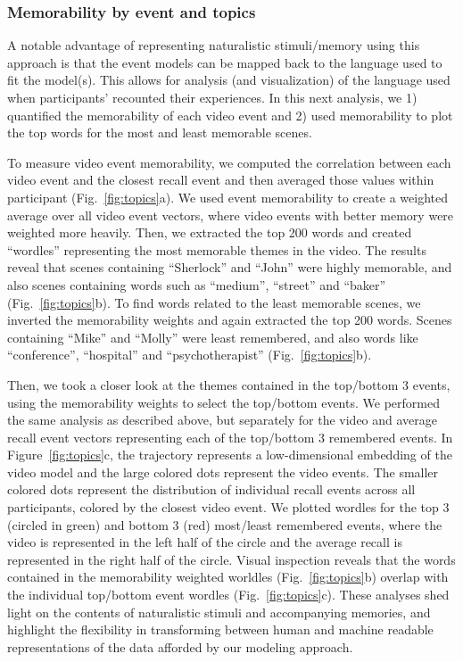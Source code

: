 \documentclass{article}
\begin{document}
{\subsubsection{Memorability by event and topics}
A notable advantage of representing naturalistic stimuli/memory using this approach is that the event models can be mapped back to the language used to fit the model(s).  This allows for analysis (and visualization) of the language used when participants' recounted their experiences.  In this next analysis, we 1) quantified the memorability of each video event and 2) used memorability to plot the top words for the most and least memorable scenes.

To measure video event memorability, we computed the correlation between each video event and the closest recall event and then averaged those values within participant (Fig.~\ref{fig:topics}a). We used event memorability to create a weighted average over all video event vectors, where video events with better memory were weighted more heavily. Then, we extracted the top 200 words and created ``wordles'' representing the most memorable themes in the video. The results reveal that scenes containing ``Sherlock'' and ``John'' were highly memorable, and also scenes containing words such as ``medium'', ``street'' and ``baker'' (Fig.~\ref{fig:topics}b). To find words related to the least memorable scenes, we inverted the memorability weights and again extracted the top 200 words.  Scenes containing ``Mike'' and ``Molly'' were least remembered, and also words like ``conference'', ``hospital'' and ``psychotherapist'' (Fig.~\ref{fig:topics}b).

Then, we took a closer look at the themes contained in the top/bottom 3 events, using the memorability weights to select the top/bottom events. We performed the same analysis as described above, but separately for the video and average recall event vectors representing each of the top/bottom 3 remembered events. In Figure~\ref{fig:topics}c, the trajectory represents a low-dimensional embedding of the video model and the large colored dots represent the video events. The smaller colored dots represent the distribution of individual recall events across all participants, colored by the closest video event. We plotted wordles for the top 3 (circled in green) and bottom 3 (red) most/least remembered events, where the video is represented in the left half of the circle and the average recall is represented in the right half of the circle. Visual inspection reveals that the words contained in the memorability weighted worldles (Fig.~\ref{fig:topics}b) overlap with the individual top/bottom event wordles (Fig.~\ref{fig:topics}c). These analyses shed light on the contents of naturalistic stimuli and accompanying memories, and highlight the flexibility in transforming between human and machine readable representations of the data afforded by our modeling approach.

}
\end{document}
